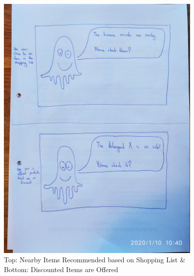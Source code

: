 \begin{figure}[H]
	\centering
	\includegraphics[trim={10em 60em 20em 0em}, clip, width=0.9\textwidth]{images/s1/p3.jpg}
	\caption{Top: Nearby Items Recommended based on Shopping List \& Bottom: Discounted Items are Offered}
	\label{s1:offer}
\end{figure}

